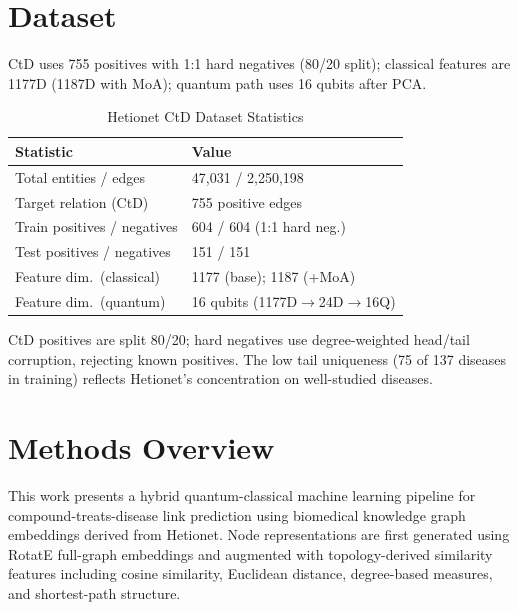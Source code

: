 \section{Dataset}

\ifqceshort
CtD uses 755 positives with 1:1 hard negatives (80/20 split); classical
features are 1177D (1187D with MoA); quantum path uses 16 qubits after PCA.
\else
\begin{table}[t]
\caption{Hetionet CtD Dataset Statistics}
\label{tab:dataset}
\centering\small
\begin{tabular}{@{}ll@{}}
\toprule
\textbf{Statistic} & \textbf{Value} \\
\midrule
Total entities / edges & 47,031 / 2,250,198 \\
Target relation (CtD) & 755 positive edges \\
Train positives / negatives & 604 / 604 (1:1 hard neg.) \\
Test positives / negatives & 151 / 151 \\
Feature dim.\ (classical) & 1177 (base); 1187 (+MoA) \\
Feature dim.\ (quantum) & 16 qubits (1177D$\to$24D$\to$16Q) \\
\bottomrule
\end{tabular}
\end{table}

CtD positives are split 80/20; hard negatives use degree-weighted head/tail
corruption, rejecting known positives.
The low tail uniqueness (75 of 137 diseases in training) reflects Hetionet's
concentration on well-studied diseases.
\fi

\ifqceshort\else
\section{Methods Overview}

This work presents a hybrid quantum-classical machine learning pipeline for
compound-treats-disease link prediction using biomedical knowledge graph
embeddings derived from Hetionet. Node representations are first generated
using RotatE full-graph embeddings and augmented with topology-derived
similarity features including cosine similarity, Euclidean distance,
degree-based measures, and shortest-path structure.

